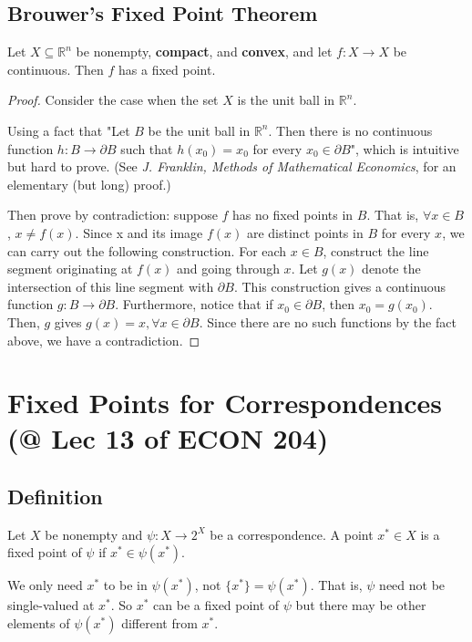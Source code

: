 \documentclass[11pt]{elegantbook}
\begin{document}
\subsection{Brouwer's Fixed Point Theorem}
\begin{theorem}
    Let $X \subseteq \mathbb{R}^n$ be nonempty, \textbf{compact}, and \textbf{convex}, and let $f : X \rightarrow X$ be continuous. Then $f$ has a fixed point.
\end{theorem}
\begin{proof}
    \normalfont
    Consider the case when the set $X$ is the unit ball in $\mathbb{R}^n$.

    Using a fact that "Let $B$ be the unit ball in $\mathbb{R}^n$. Then there is no continuous function $h : B \rightarrow \partial B$ such that $h(x_0) = x_0$ for every $x_0 \in \partial B$", which is intuitive but hard to prove. (See \textit{J. Franklin, Methods of Mathematical Economics}, for an elementary (but long) proof.)

    Then prove by contradiction: suppose $f$ has no fixed points in $B$. That is, $\forall x\in B$, $x\neq f(x)$. Since x and its image $f(x)$ are distinct points in $B$ for every $x$, we can carry out the following construction. For each $x \in B$, construct the line segment originating at $f(x)$ and going through $x$. Let $g(x)$ denote the intersection of this line segment with $\partial B$. This construction gives a continuous function $g : B \rightarrow \partial B$. Furthermore, notice that if $x_0 \in \partial B$, then $x_0 = g(x_0)$. Then, $g$ gives $g(x)=x,\forall x\in \partial B$. Since there are no such functions by the fact above, we have a contradiction.
\end{proof}


\section{Fixed Points for Correspondences \small{(@ Lec 13 of ECON 204)}}
\subsection{Definition}
\begin{definition}
    \normalfont
    Let $X$ be nonempty and $\psi : X \rightarrow 2^X$ be a correspondence. A point $x^* \in X$ is a fixed point of $\psi$ if $x^* \in \psi(x^*)$.
\end{definition}
\begin{note}
    We only need $x^*$ to be in $\psi(x^*)$, not $\{x^*\} = \psi(x^*)$. That is, $\psi$ need not be single-valued at $x^*$. So $x^*$ can be a fixed point of $\psi$ but there may be other elements of $\psi(x^*)$ different from $x^*$.
\end{note}
\end{document}
